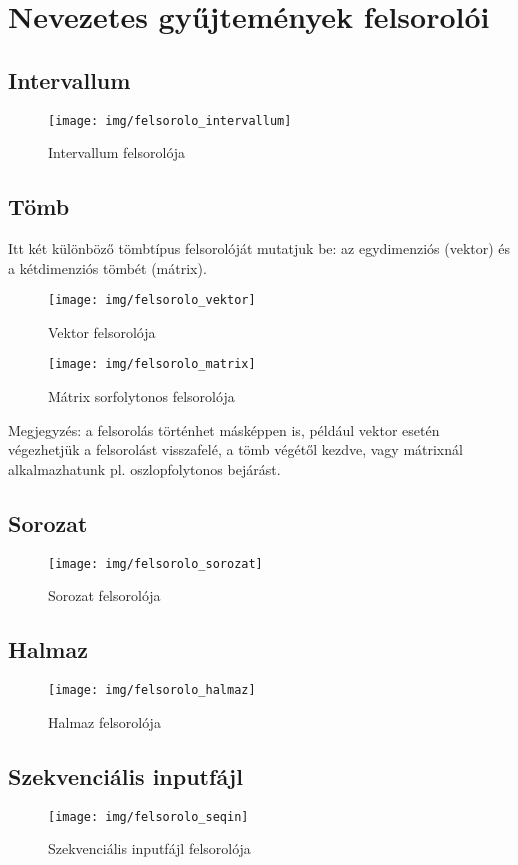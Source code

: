 \documentclass[margin=0px]{article}
\begin{document}
	
	
	\section{Nevezetes gyűjtemények felsorolói}
	
	\subsection{Intervallum}
		\begin{figure}[H]
			\centering
			\texttt{[image: img/felsorolo\_intervallum]}
			\caption{Intervallum felsorolója}
			\label{fig:felsorolo_intervallum}
		\end{figure}
	
	\subsection{Tömb}
	Itt két különböző tömbtípus felsorolóját mutatjuk be: az egydimenziós (vektor) és a kétdimenziós tömbét (mátrix).
	
	\begin{figure}[H]
		\centering
		\texttt{[image: img/felsorolo\_vektor]}
		\caption{Vektor felsorolója}
		\label{fig:felsorolo_vektor}
	\end{figure}
	
	\begin{figure}[H]
		\centering
		\texttt{[image: img/felsorolo\_matrix]}
		\caption{Mátrix sorfolytonos felsorolója}
		\label{fig:felsorolo_matrix}
	\end{figure}
	
	Megjegyzés: a felsorolás történhet másképpen is, például vektor esetén végezhetjük a felsorolást visszafelé, a tömb végétől kezdve, vagy mátrixnál alkalmazhatunk pl. oszlopfolytonos bejárást.
	
	\subsection{Sorozat}
		\begin{figure}[H]
			\centering
			\texttt{[image: img/felsorolo\_sorozat]}
			\caption{Sorozat felsorolója}
			\label{fig:felsorolo_sorozat}
		\end{figure}

	\subsection{Halmaz}
		\begin{figure}[H]
			\centering
			\texttt{[image: img/felsorolo\_halmaz]}
			\caption{Halmaz felsorolója}
			\label{fig:felsorolo_halmaz}
		\end{figure}

	\subsection{Szekvenciális inputfájl}
		\begin{figure}[H]
			\centering
			\texttt{[image: img/felsorolo\_seqin]}
			\caption{Szekvenciális inputfájl felsorolója}
			\label{fig:felsorolo_seqin}
		\end{figure}
	
\end{document}
